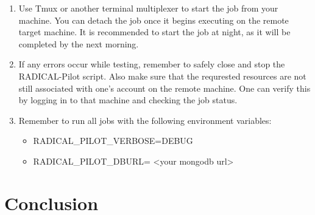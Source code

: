 \documentclass[]{article}
\begin{document}
\begin{enumerate}
			\item Use Tmux or another terminal multiplexer to start the job from your machine. You can detach the job once it begins executing on the remote target machine. It is recommended to start the job at night, as it will be completed by the next morning.
			\item If any errors occur while testing, remember to safely close and stop the RADICAL-Pilot script. Also make sure that the requrested resources are not still associated with one's account on the remote machine. One can verify this by logging in to that machine and checking the job status.
			\item Remember to run all jobs with the following environment variables:
				\begin{itemize}
					\item RADICAL\_PILOT\_VERBOSE=DEBUG
					\item RADICAL\_PILOT\_DBURL= <your mongodb url>
				\end{itemize}
		\end{enumerate}

\section{Conclusion}
\end{document}

